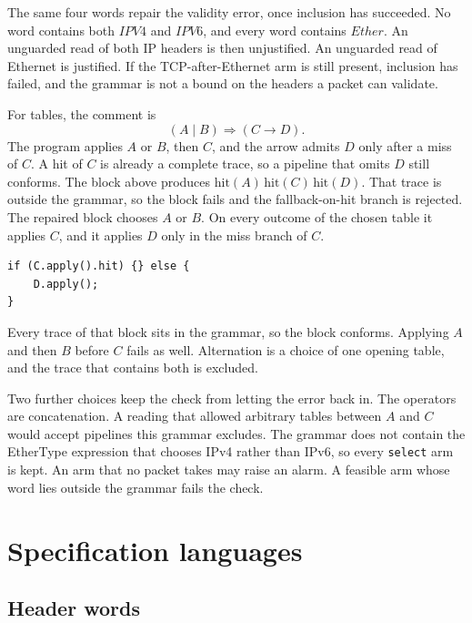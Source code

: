\documentclass[a4paper,UKenglish,cleveref,autoref]{lipics-v2021}
\begin{document}
The same four words repair the validity error, once inclusion has succeeded.
No word contains both \(\mathit{IPV4}\) and \(\mathit{IPV6}\), and every word contains \(\mathit{Ether}\).
An unguarded read of both IP headers is then unjustified.
An unguarded read of Ethernet is justified.
If the TCP-after-Ethernet arm is still present, inclusion has failed, and the grammar is not a bound on the headers a packet can validate.

For tables, the comment is
\[
  (A \mid B) \Rightarrow (C \rightarrow D).
\]
The program applies \(A\) or \(B\), then \(C\), and the arrow admits \(D\) only after a miss of \(C\).
A hit of \(C\) is already a complete trace, so a pipeline that omits \(D\) still conforms.
The block above produces \(\mathrm{hit}(A)\,\mathrm{hit}(C)\,\mathrm{hit}(D)\).
That trace is outside the grammar, so the block fails and the fallback-on-hit branch is rejected.
The repaired block chooses \(A\) or \(B\).
On every outcome of the chosen table it applies \(C\), and it applies \(D\) only in the miss branch of \(C\).
\begin{lstlisting}[basicstyle=\scriptsize\ttfamily,columns=fullflexible,keepspaces=true,
  aboveskip=0.7em,belowskip=0.55em,xleftmargin=1.4em,framesep=0pt,frame=none]
if (C.apply().hit) {} else {
    D.apply();
}
\end{lstlisting}
Every trace of that block sits in the grammar, so the block conforms.
Applying \(A\) and then \(B\) before \(C\) fails as well.
Alternation is a choice of one opening table, and the trace that contains both is excluded.

Two further choices keep the check from letting the error back in.
The operators are concatenation.
A reading that allowed arbitrary tables between \(A\) and \(C\) would accept pipelines this grammar excludes.
The grammar does not contain the EtherType expression that chooses IPv4 rather than IPv6, so every \texttt{select} arm is kept.
An arm that no packet takes may raise an alarm.
A feasible arm whose word lies outside the grammar fails the check.

\section{Specification languages}
\label{sec:spec}

\subsection{Header words}
\end{document}
